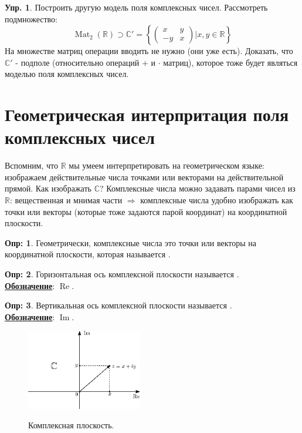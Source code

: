\documentclass[12pt]{article}
\newcommand{\MR}{\mathbb{R}}
\newcommand{\MC}{\mathbb{C}}
\theoremstyle{definition}
\newtheorem{defn}{Опр:}
\newtheorem{exrc}{Упр.}
\newcommand{\matsq}[1]{\operatorname{Mat}_{#1}}
\DeclareMathOperator{\IM}{\operatorname{Im}}
\DeclareMathOperator{\RE}{\operatorname{Re}}
\begin{document}
\begin{exrc}
	Построить другую модель поля комплексных чисел. Рассмотреть подмножество: 
	$$
		\matsq{2}(\MR) \supset \MC'= 
		\left\{
			\begin{pmatrix}
				x & y \\
				-y & x
			\end{pmatrix} \bigg| x,y \in \MR 
		\right\}
	$$
	На множестве матриц операции вводить не нужно (они уже есть). Доказать, что $\MC'$ - подполе (относительно операций $+$ и $\cdot$ матриц), которое тоже будет являться моделью поля комплексных чисел.
\end{exrc}

\newpage

\section*{Геометрическая интерпритация поля комплексных чисел}
Вспомним, что $\MR$ мы умеем интерпретировать на геометрическом языке: изображаем действительные числа точками или векторами на действительной прямой. Как изображать $\MC$? Комплексные числа можно задавать парами чисел из $\MR$: вещественная и мнимая части $\Rightarrow$ комплексные числа удобно изображать как точки или векторы (которые тоже задаются парой координат) на координатной плоскости.
\begin{defn}
	Геометрически, комплексные числа это точки или векторы на координатной плоскости, которая называется .
\end{defn}

\begin{defn}
	Горизонтальная ось комплексной плоскости называется . \\
	\textbf{\uline{Обозначение}}: $\RE$.	
\end{defn}
\begin{defn}
	Вертикальная ось комплексной плоскости называется .\\ \textbf{\uline{Обозначение}}: $\IM$.
\end{defn}

\begin{figure}[H]
	\centering
	\includegraphics[width=0.45\textwidth]{AL1L13_1.eps}
	\label{AL1L13_1}
	\caption{Комплексная плоскость.}
\end{figure}
\end{document}
